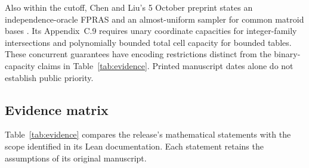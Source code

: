 \documentclass[11pt]{article}
\begin{document}
Also within the cutoff, Chen and Liu's 5 October preprint states an independence-oracle FPRAS and an almost-uniform sampler for common matroid bases \cite{ChenLiu2026}. Its Appendix~C.9 requires unary coordinate capacities for integer-family intersections and polynomially bounded total cell capacity for bounded tables. These concurrent guarantees have encoding restrictions distinct from the binary-capacity claims in Table~\ref{tab:evidence}. Printed manuscript dates alone do not establish public priority.

\subsection{Evidence matrix}
Table~\ref{tab:evidence} compares the release's mathematical statements with the scope identified in its Lean documentation. Each statement retains the assumptions of its original manuscript.
\end{document}
